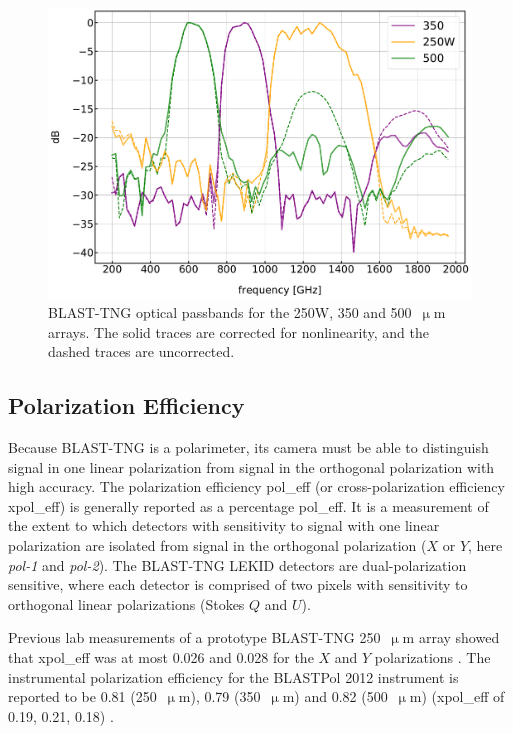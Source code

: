 \begin{figure}[!htbp]
\centering
\includegraphics[width=\textwidth]{figures/blast_data/fts/passbands_raw}
\caption{BLAST-TNG optical passbands for the 250W, 350 and 500~$\upmu$m arrays. The solid traces are corrected for nonlinearity, and the dashed traces are uncorrected.}
\label{fig:passbands_corr}
\end{figure}

\subsection{Polarization Efficiency}\label{pol eff}

Because BLAST-TNG is a polarimeter, its camera must be able to distinguish signal in one linear polarization from signal in the orthogonal polarization with high accuracy. The polarization efficiency \gls{pol_eff} (or cross-polarization efficiency \gls{xpol_eff}) is generally reported as a percentage \gls{pol_eff}. It is a measurement of the extent to which detectors with sensitivity to signal with one linear polarization are isolated from signal in the orthogonal polarization ($X$ or $Y$, here \textit{pol-1} and \textit{pol-2}). The BLAST-TNG LEKID detectors are dual-polarization sensitive, where each detector is comprised of two pixels with sensitivity to orthogonal linear polarizations (Stokes $Q$ and $U$).

Previous lab measurements of a prototype BLAST-TNG 250~$\upmu$m array showed that \gls{xpol_eff} was at most 0.026 and 0.028 for the $X$ and $Y$ polarizations \citep{dober2016optical}. The instrumental polarization efficiency for the BLASTPol 2012 instrument is reported to be 0.81 (250~$\upmu$m), 0.79 (350~$\upmu$m) and 0.82 (500~$\upmu$m) (\gls{xpol_eff} of 0.19, 0.21, 0.18) \citep{shariff2015polarimetry}.

